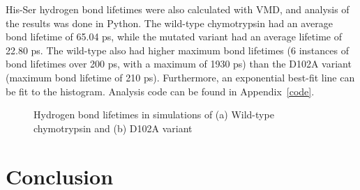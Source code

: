 \documentclass[11pt, twocolumn]{article}
\begin{document}
His-Ser hydrogen bond lifetimes were also calculated with VMD, and analysis
of the results was done in Python. The wild-type chymotrypsin had an average
bond lifetime of 65.04 ps, while the mutated variant had an average lifetime
of 22.80 ps. The wild-type also had higher maximum bond lifetimes (6 instances
of bond lifetimes over 200 ps, with a maximum of 1930 ps) than the D102A
variant (maximum bond lifetime of 210 ps). Furthermore, an exponential
best-fit line can be fit to the histogram.
Analysis code can be found in Appendix~\ref{code}.

\begin{figure}[H]
    \centering


    \caption{Hydrogen bond lifetimes in simulations of
        (a) Wild-type chymotrypsin and (b) D102A variant
        }\label{fig:hbond_times}
\end{figure}


\newpage
\section{Conclusion}
\end{document}
